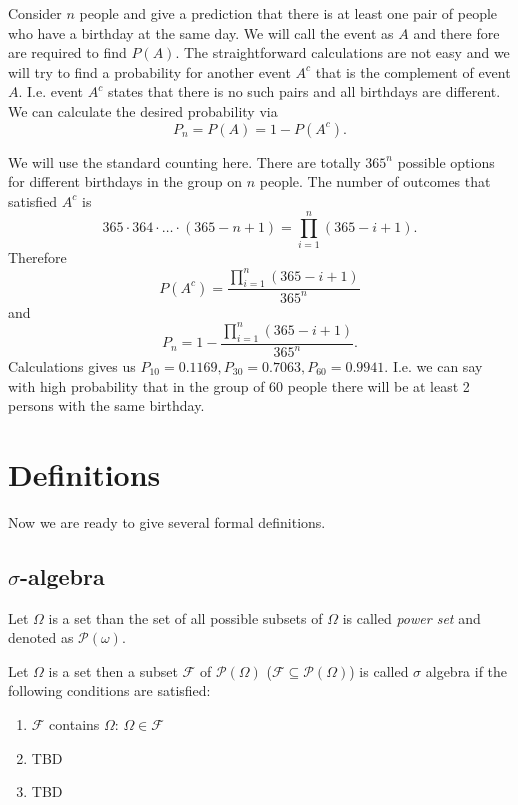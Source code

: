 \begin{example}
Consider $n$ people and give a prediction that there is at least one
pair of people who have a birthday at the same day. We will call the
event as $A$ and there fore are required to find $P(A)$. 
The straightforward calculations are not easy and we will try to find
a probability for another event $A^c$ that is the complement of event
$A$. I.e. event $A^c$ states that there is no such pairs and all
birthdays are different. We can calculate the desired probability via 
\[
P_n = P(A) = 1 - P(A^c).
\]

We will use the standard counting here. There are totally $365^n$
possible options for different birthdays in the group on $n$ people.
The number of outcomes that satisfied $A^c$ is 
\[
365 \cdot 364 \cdot \dots \cdot (365 -n +1) = 
\prod_{i = 1}^n (365 - i + 1).
\]
Therefore
\[
P(A^c) = \frac{\prod_{i = 1}^n (365 - i + 1)}{365^n}
\]
and
\[
P_n = 1 - \frac{\prod_{i = 1}^n (365 - i + 1)}{365^n}.
\]
Calculations gives us
$P_{10} = 0.1169, P_{30} = 0.7063, P_{60} = 0.9941$. I.e. we can say
with high probability
that in the group of 60 people there will be at least 2 persons with
the same birthday.
\end{example}

\section{Definitions}
Now we are ready to give several formal definitions. 
\subsection{$\sigma$-algebra}
\begin{definition}
\label{def:powerset}
Let $\Omega$ is a set than the set of all possible subsets of $\Omega$
is called \textit{power set} and denoted as
$\mathcal{P}\left(\omega\right)$. 
\end{definition}

\begin{definition}
Let $\Omega$ is a set then a subset $\mathcal{F}$ of
 $\mathcal{P}\left(\Omega\right)$ ($\mathcal{F}\subseteq
\mathcal{P}\left(\Omega\right)$) is called $\sigma$ algebra if the
following conditions are 
satisfied:
\begin{enumerate}
\item $\mathcal{F}$ contains $\Omega$: $\Omega \in \mathcal{F}$
\item TBD
\item TBD
\end{enumerate} 
\end{definition}

